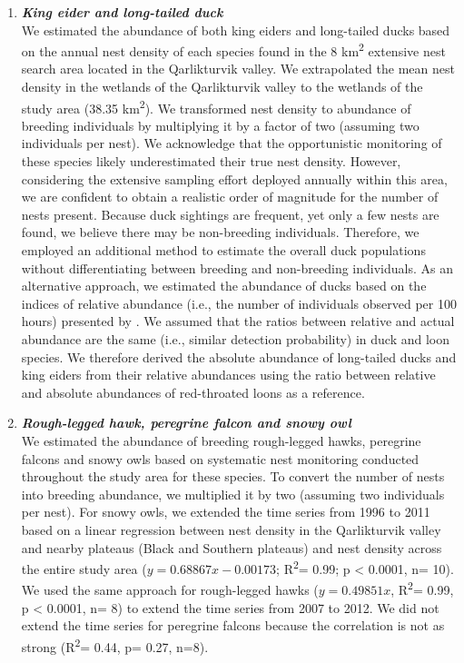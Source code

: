 \documentclass[a4paper,twoside,12pt]{article}
\begin{document}
\begin{enumerate}[label=\alph*.]
                \item[] \textit{\textbf{King eider and long-tailed duck}}\\
                We estimated the abundance of both king eiders and long-tailed ducks based on the annual nest density of each species found in the 8 km\textsuperscript{2} extensive nest search area located in the Qarlikturvik valley. We extrapolated the mean nest density in the wetlands of the Qarlikturvik valley to the wetlands of the study area (38.35 km\textsuperscript{2}). We transformed nest density to abundance of breeding individuals by multiplying it by a factor of two (assuming two individuals per nest). We acknowledge that the opportunistic monitoring of these species likely underestimated their true nest density. However, considering the extensive sampling effort deployed annually within this area, we are confident to obtain a realistic order of magnitude for the number of nests present. Because duck sightings are frequent, yet only a few nests are found, we believe there may be non-breeding individuals. Therefore, we employed an additional method to estimate the overall duck populations without differentiating between breeding and non-breeding individuals. 
As an alternative approach, we estimated the abundance of ducks based on the indices of relative abundance (i.e., the number of individuals observed per 100 hours) presented by \citet{gauthier2024a}. We assumed that the ratios between relative and actual abundance are the same (i.e., similar detection probability) in duck and loon species. We therefore derived the absolute abundance of long-tailed ducks and king eiders from their relative abundances using the ratio between relative and absolute abundances of red-throated loons as a reference.
                                
                                
                \item[] \textit{\textbf{Rough-legged hawk, peregrine falcon and snowy owl}} \\
                We estimated the abundance of breeding rough-legged hawks, peregrine falcons and snowy owls based on systematic nest monitoring conducted throughout the study area for these species. To convert the number of nests into breeding abundance, we multiplied it by two (assuming two individuals per nest). For snowy owls, we extended the time series from 1996 to 2011 based on a linear regression between nest density in the Qarlikturvik valley and nearby plateaus (Black and Southern plateaus) and nest density across the entire study area ($y= 0.68867x -0.00173$; R\textsuperscript{2}= 0.99; p < 0.0001, n= 10). We used the same approach for rough-legged hawks ($y=0.49851x$, R\textsuperscript{2}= 0.99, p < 0.0001, n= 8) to extend the time series from 2007 to 2012. We did not extend the time series for peregrine falcons because the correlation is not as strong (R\textsuperscript{2}= 0.44, p= 0.27, n=8).
                

\end{enumerate}
\end{document}
